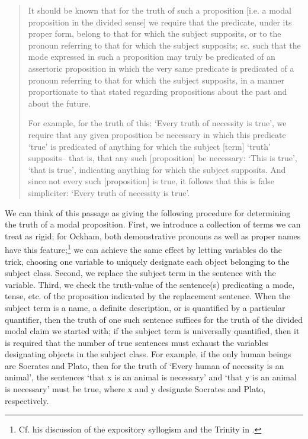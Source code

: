 \documentclass[a4paper]{article}
\begin{document}
\begin{quote}
It should be known that for the truth of such a proposition [i.e. a modal proposition in the divided sense] we require that the predicate, under its proper form, belong to that for which the subject supposits, or to the pronoun referring to that for which the subject supposits; sc. such that the mode expressed in such a proposition may truly be predicated of an assertoric proposition in which the very same predicate is predicated of a pronoun referring to that for which the subject supposits, in a manner proportionate to that stated regarding propositions about the past and about the future. 

For example, for the truth of this: `Every truth of necessity is true', we require that any given proposition be necessary in which this predicate `true' is predicated of anything for which the subject [term] `truth' supposits– that is, that any such [proposition] be necessary:  `This is true', `that is true', indicating anything for which the subject supposits. And since not every such [proposition] is true, it follows that this is false simpliciter: `Every truth of necessity is true'. \cite[II. 10, p. 249]{OckhamSL2} 
\end{quote}

We can think of this passage as giving the following procedure for determining the truth of a modal proposition. First, we introduce a collection of terms we can treat as rigid; for Ockham, both demonstrative pronouns as well as proper names have this feature;\footnote{Cf. his discussion of the expository syllogism and the Trinity in \cite[II. 27, p. 306]{OckhamSL2}.} we can achieve the same effect by letting variables do the trick, choosing one variable to uniquely designate each object belonging to the subject class. Second, we replace the subject term in the sentence with the variable. Third, we check the truth-value of the sentence(s) predicating a mode, tense, etc. of the proposition indicated by the replacement sentence. When the subject term is a name, a definite description, or is quantified by a particular quantifier, then the truth of one such sentence suffices for the truth of the divided modal claim we started with; if the subject term is universally quantified, then it is required that the number of true sentences must exhaust the variables designating objects in the subject class. For example, if the only human beings are Socrates and Plato, then for the truth of `Every human of necessity is an animal', the sentences `that x is an animal is necessary' and `that y is an animal is necessary' must be true, where x and y designate Socrates and Plato, respectively.
\end{document}
